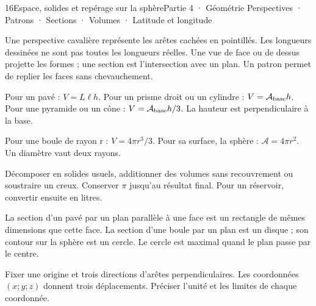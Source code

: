 \begin{ouverture}[espace]{16}{Espace, solides et repérage sur la sphère}{Partie 4 · Géométrie}
{Perspectives · Patrons · Sections · Volumes · Latitude et longitude}
\end{ouverture}
\pagestyle{otMain}\essentiel\fontsize{11}{15}\selectfont
{}
\begin{savoirfaire}Une perspective cavalière représente les arêtes cachées en pointillés. Les longueurs dessinées ne sont pas toutes les longueurs réelles. Une vue de face ou de dessus projette les formes ; une section est l’intersection avec un plan. Un patron permet de replier les faces sans chevauchement.\end{savoirfaire}
\begin{propriete}Pour un pavé : $V=L\ell h$. Pour un prisme droit ou un cylindre : $V=\mathcal A_{\rm base}h$. Pour une pyramide ou un cône : $V=\mathcal A_{\rm base}h/3$. La hauteur est perpendiculaire à la base.\end{propriete}
\begin{propriete}Pour une boule de rayon r : $V=4\pi r^3/3$. Pour sa surface, la sphère : $\mathcal A=4\pi r^2$. Un diamètre vaut deux rayons.\end{propriete}
\begin{savoirfaire}[Assembler]Décomposer en solides usuels, additionner des volumes sans recouvrement ou soustraire un creux. Conserver $\pi$ jusqu’au résultat final. Pour un réservoir, convertir ensuite en litres.\end{savoirfaire}
\clearpage
{}
\begin{propriete}La section d’un pavé par un plan parallèle à une face est un rectangle de mêmes dimensions que cette face. La section d’une boule par un plan est un disque ; son contour sur la sphère est un cercle. Le cercle est maximal quand le plan passe par le centre.\end{propriete}
\begin{savoirfaire}Fixer une origine et trois directions d’arêtes perpendiculaires. Les coordonnées $(x;y;z)$ donnent trois déplacements. Préciser l’unité et les limites de chaque coordonnée.\end{savoirfaire}
